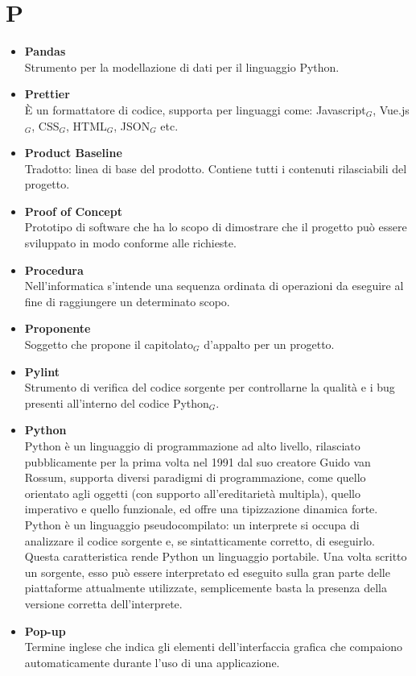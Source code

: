 \chapter{P} \label{P}
	\begin{itemize}
		\item \textbf{Pandas}\\
		Strumento per la modellazione di dati per il linguaggio Python.
		\item \textbf{Prettier} \\
		È un formattatore di codice, supporta per linguaggi come: Javascript$_G$, Vue.js$_G$, CSS$_G$, HTML$_G$, JSON$_G$ etc.

		\item \textbf{Product Baseline}\\
		Tradotto: linea di base del prodotto.
		Contiene tutti i contenuti rilasciabili del progetto.

		\item \textbf{Proof of Concept}\\
		Prototipo di software che ha lo scopo di dimostrare che il progetto può essere sviluppato in modo conforme alle richieste.

		\item \textbf{Procedura}\\
		Nell'informatica s'intende una sequenza ordinata di operazioni da eseguire al fine di raggiungere un determinato scopo.

		\item \textbf{Proponente}\\
		Soggetto che propone il capitolato$_G$ d'appalto per un progetto.

		\item \textbf{Pylint} \\
		Strumento di verifica del codice sorgente per controllarne la qualità e i bug presenti all'interno del codice Python$_G$.

		\item \textbf{Python}\\
		Python è un linguaggio di programmazione ad alto livello, rilasciato pubblicamente per la prima volta nel 1991 dal suo creatore Guido van Rossum, supporta diversi paradigmi di programmazione, come quello orientato agli oggetti (con supporto all'ereditarietà multipla), quello imperativo e quello funzionale, ed offre una tipizzazione dinamica forte.
		Python è un linguaggio pseudocompilato: un interprete si occupa di analizzare il codice sorgente e, se sintatticamente corretto, di eseguirlo. Questa caratteristica rende Python un linguaggio portabile. Una volta scritto un sorgente, esso può essere interpretato ed eseguito sulla gran parte delle piattaforme attualmente utilizzate, semplicemente basta la presenza della versione corretta dell’interprete.

		\item \textbf{Pop-up}\\
		Termine inglese che indica gli elementi dell'interfaccia grafica che compaiono automaticamente durante l'uso di una applicazione.
	\end{itemize}
